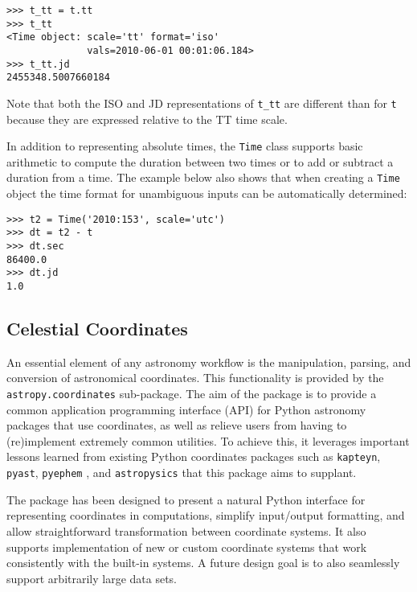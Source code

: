 \documentclass[traditabstract]{aa}
\begin{document}
\begin{verbatim}
>>> t_tt = t.tt
>>> t_tt
<Time object: scale='tt' format='iso'
              vals=2010-06-01 00:01:06.184>
>>> t_tt.jd
2455348.5007660184
\end{verbatim}

Note that both the ISO and JD representations of \verb|t_tt| are different than for
\verb|t| because they are expressed relative to the TT time scale.

In addition to representing absolute times, the \verb|Time| class supports
basic arithmetic to compute the duration between two times or to add or
subtract a duration from a time.  The example below also shows that when
creating a \verb|Time| object the time format for unambiguous inputs can be
automatically determined:

\begin{verbatim}
>>> t2 = Time('2010:153', scale='utc')
>>> dt = t2 - t
>>> dt.sec
86400.0
>>> dt.jd
1.0
\end{verbatim}

\subsection{Celestial Coordinates}



An essential element of any astronomy workflow 
is the manipulation, parsing, and conversion of astronomical coordinates.
This functionality is provided by the \texttt{astropy.coordinates} sub-package.
The aim of the package is to provide a common application programming interface (API)
for Python astronomy packages that use coordinates, as well as
relieve users from having to (re)implement extremely common utilities.
To achieve this, it leverages important lessons learned from existing
Python coordinates packages such as \texttt{kapteyn}, \texttt{pyast},
\texttt{pyephem} \citep{pyephem}, and \texttt{astropysics}
\citep{astropysics} that this package aims to supplant.

The package has been designed to present a natural Python
interface for representing coordinates in computations, simplify
input/output formatting, and allow straightforward transformation
between coordinate systems. 
It also supports implementation of new or custom
coordinate systems that work consistently with the built-in systems.
A future design goal is to also seamlessly
support arbitrarily large data sets.
\end{document}
